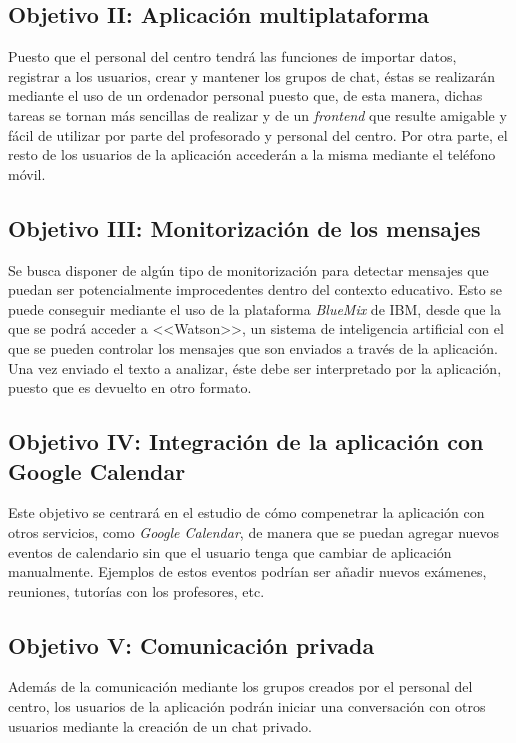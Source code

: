 \subsection{Objetivo II: Aplicación multiplataforma}
Puesto que el personal del centro tendrá las funciones de importar datos, registrar a los usuarios, crear y mantener los grupos de chat, éstas se realizarán mediante el uso de un ordenador personal puesto que, de esta manera, dichas tareas se tornan más sencillas de realizar y de un \textit{frontend} que resulte amigable y fácil de utilizar por parte del profesorado y personal del centro. Por otra parte, el resto de los usuarios de la aplicación accederán a la misma mediante el teléfono móvil.

\subsection{Objetivo III: Monitorización de los mensajes}
Se busca disponer de algún tipo de monitorización para detectar mensajes que puedan ser potencialmente improcedentes dentro del contexto educativo. Esto se puede conseguir mediante el uso de la plataforma \textit{BlueMix} de IBM, desde que la que se podrá acceder a <<Watson>>, un sistema de inteligencia artificial con el que se pueden controlar los mensajes que son enviados a través de la aplicación. Una vez enviado el texto a analizar, éste debe ser interpretado por la aplicación, puesto que es devuelto en otro formato.

\subsection{Objetivo IV: Integración de la aplicación con Google Calendar}
Este objetivo se centrará en el estudio de cómo compenetrar la aplicación con otros servicios, como \textit{Google Calendar}, de manera que se puedan agregar nuevos eventos de calendario sin que el usuario tenga que cambiar de aplicación manualmente. Ejemplos de estos eventos podrían ser añadir nuevos exámenes, reuniones, tutorías con los profesores, etc.

\subsection{Objetivo V: Comunicación privada}
Además de la comunicación mediante los grupos creados por el personal del centro, los usuarios de la aplicación podrán iniciar una conversación con otros usuarios mediante la creación de un chat privado.

